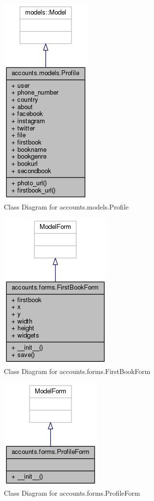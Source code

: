 \begin{figure}
    \centering
    \includegraphics[scale=.85]{images/classaccounts.png}
    \caption{Class Diagram for accounts.models.Profile}
    \label{fig:collaborative1}
\end{figure}

\begin{figure}
    \centering
    \includegraphics[scale=.85]{images/classacountsform.png}
    \caption{Class Diagram for accounts.forms.FirstBookForm}
    \label{fig:collaborative}
\end{figure}

\begin{figure}
\centering
\includegraphics[scale=.85]{images/profileform.png}
\caption{Class Diagram for accounts.forms.ProfileForm}
\label{fig:classAnnotation__coll__graph}
\end{figure}
